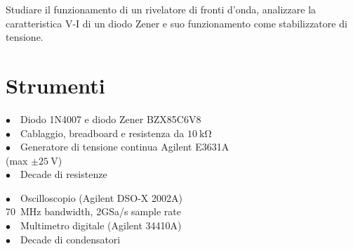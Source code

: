 Studiare il funzionamento di un rivelatore di fronti d'onda, analizzare la caratteristica V-I di un diodo Zener e suo funzionamento come stabilizzatore di tensione.

\section{Strumenti}
%
\phantom{porcodio!}
\noindent
\begin{minipage}{.5\linewidth}
$\bullet \quad$Diodo 1N4007 e diodo Zener BZX85C6V8\\
$\bullet \quad$Cablaggio, breadboard e resistenza da $\SI{10}{\kilo\ohm}$\\
$\bullet \quad$Generatore di tensione continua Agilent E3631A\\ \phantom{aa} (max $\pm \SI{25}{\volt}$)\\
$\bullet \quad$Decade di resistenze
\end{minipage}%
\begin{minipage}{.5\linewidth}
$\bullet \quad$Oscilloscopio (Agilent DSO-X 2002A)\\
\phantom{xxxx}\SI{70}{\mega\hertz} bandwidth, 2GSa/s sample rate\\
$\bullet \quad$Multimetro digitale (Agilent 34410A)\\
$\bullet \quad$Decade di condensatori
\end{minipage}